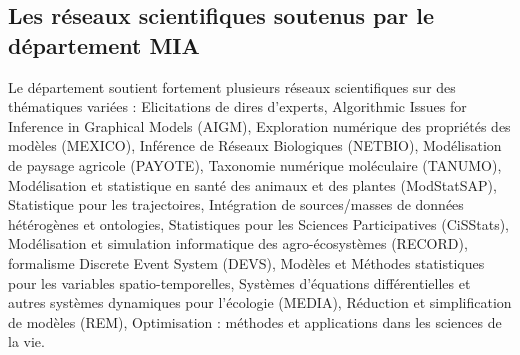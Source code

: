 \subsection{Les r\'eseaux scientifiques soutenus par le d\'epartement MIA}
Le d\'epartement soutient fortement plusieurs r\'eseaux scientifiques sur des th\'ematiques vari\'ees : Elicitations de dires d'experts, Algorithmic Issues for Inference in Graphical Models (AIGM), Exploration num\'erique des propri\'et\'es des mod\`eles (MEXICO), Inf\'erence de R\'eseaux Biologiques (NETBIO), Mod\'elisation de paysage agricole (PAYOTE), Taxonomie num\'erique mol\'eculaire (TANUMO), Mod\'elisation et statistique en sant\'e des animaux et des plantes (ModStatSAP), Statistique pour les trajectoires, Int\'egration de sources/masses de donn\'ees h\'et\'erog\`enes et ontologies, Statistiques pour les Sciences Participatives (CiSStats), Mod\'elisation et simulation informatique des agro-\'ecosyst\`emes (RECORD), formalisme Discrete Event System (DEVS), Mod\`eles et M\'ethodes statistiques pour les variables spatio-temporelles, Syst\`emes d'\'equations diff\'erentielles et autres syst\`emes dynamiques pour l'\'ecologie (MEDIA), R\'eduction et simplification de mod\`eles (REM), Optimisation : m\'ethodes et applications dans les sciences de la vie.
